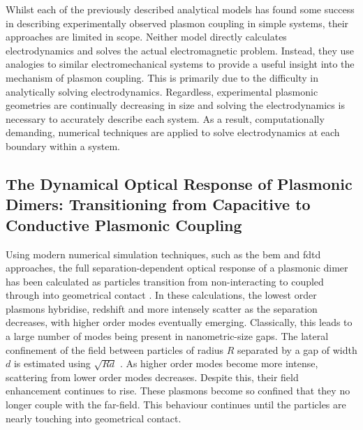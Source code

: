 \documentclass{article}
\begin{document}
Whilst each of the previously described analytical models has found some success in describing experimentally observed plasmon coupling in simple systems, their approaches are limited in scope. Neither model directly calculates electrodynamics and solves the actual electromagnetic problem. Instead, they use analogies to similar electromechanical systems to provide a useful insight into the mechanism of plasmon coupling. This is primarily due to the difficulty in analytically solving electrodynamics. Regardless, experimental plasmonic geometries are continually decreasing in size and solving the electrodynamics is necessary to accurately describe each system. As a result, computationally demanding, numerical techniques are applied to solve electrodynamics at each boundary within a system.


\subsection{The Dynamical Optical Response of Plasmonic Dimers: Transitioning from Capacitive to Conductive Plasmonic Coupling}

Using modern numerical simulation techniques, such as the \gls{bem} and \gls{fdtd} approaches, the full separation-dependent optical response of a plasmonic dimer has been calculated as particles transition from non-interacting to coupled through into geometrical contact \cite{romero2006}. In these calculations, the lowest order plasmons hybridise, redshift and more intensely scatter as the separation decreases, with higher order modes eventually emerging. Classically, this leads to a large number of modes being present in nanometric-size gaps. The lateral confinement of the field between particles of radius $R$ separated by a gap of width $d$ is estimated using $\sqrt{Rd}$ \cite{romero2006}. As higher order modes become more intense, scattering from lower order modes decreases. Despite this, their field enhancement continues to rise. These plasmons become so confined that they no longer couple with the far-field. This behaviour continues until the particles are nearly touching into geometrical contact. %
\end{document}
